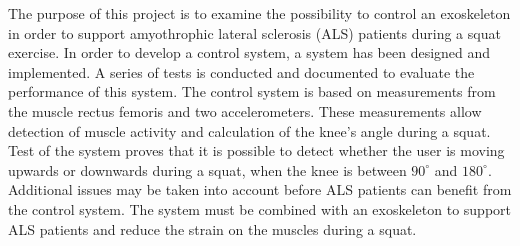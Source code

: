 The purpose of this project is to examine the possibility to control an exoskeleton in order to support amyothrophic lateral sclerosis (ALS) patients during a squat exercise. 
In order to develop a control system, a system has been designed and implemented. A series of tests is conducted and documented to evaluate the performance of this system.   
The control system is based on measurements from the muscle rectus femoris and two accelerometers. These measurements allow detection of muscle activity and calculation of the knee's angle during a squat. 
Test of the system proves that it is possible to detect whether the user is moving upwards or downwards during a squat, when the knee is between $90^{\circ}$ and $180^{\circ}$.
Additional issues may be taken into account before ALS patients can benefit from the control system. The system must be combined with an exoskeleton to support ALS patients and reduce the strain on the muscles during a squat. 